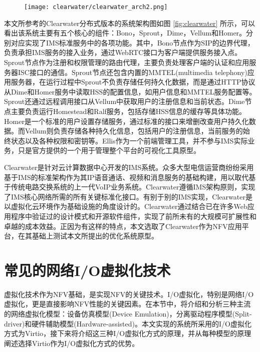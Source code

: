 \begin{figure}[!htp]
	\centering
	\texttt{[image: clearwater/clearwater\_arch2.png]}
\end{figure}
本文所参考的Clearwater分布式版本的系统架构图如图 \ref{fig:clearwater} 所示，可以看出该系统主要有五个核心的组件：Bono，Sprout，Dime，Vellum和Homer。分别对应实现了IMS标准服务中的各项功能。其中，Bono节点作为SIP的边界代理，负责承担IMS服务的接入业务，通过WebRTC接口为客户端提供服务接入点。Sprout节点作为注册和权限管理的路由代理，主要负责处理客户端的认证和应用服务器ISC接口的通信。Sprout节点还包含内置的MMTEL(multimedia telephony)应用服务器，在运行过程中Sprout不负责存储任何持久化数据，而是通过HTTP协议从Dime和Homer服务中读取HSS的配置信息，如用户信息和MMTEL服务配置等。Sprout还通过远程调用接口从Vellum中获取用户的注册信息和当前状态。Dime节点主要负责运行Homestead和Ralf服务，包括存储HSS信息的缓存等具体功能。Homer是一个标准的用户设置存储服务，通过标准的接口来增删改查用户持久化数据。而Vellum则负责存储各种持久化信息，包括用户的注册信息，当前服务的始终状态以及各种权限和密钥等。Ellis作为一个前端管理工具，并不参与IMS实际业务，只是官方提供的一个用于管理整个平台的可视化工具原型。

Clearwater是针对云计算数据中心开发的IMS系统。众多大型电信运营商纷纷采用基于IMS的标准架构作为其IP语音通话、视频和消息服务的基础构建，用以取代基于传统电路交换系统的上一代VoIP业务系统。Clearwater遵循IMS架构原则，实现了IMS核心网络所需的所有关键标准化接口。有别于别的IMS实现，Clearwater是以虚拟化云环境作为基础设施的角度设计的。Clearwater通过结合已在许多Web应用程序中验证过的设计模式和开源软件组件，实现了前所未有的大规模可扩展性和卓越的成本效益。正因为有这样的特点，本文选取了Clearwater作为NFV应用平台，在其基础上测试本文所提出的优化系统原型。

\section{常见的网络I/O虚拟化技术}
\label{intro:IO}
虚拟化技术作为NFV基础，是实现NFV的关键技术。I/O虚拟化，特别是网络I/O虚拟化，更是直接影响NFV性能的关键因素。在本节中，将介绍和分析三种主流的网络虚拟化模型：设备仿真模型(Device Emulation)，分离驱动程序模型(Split-driver)和硬件辅助模型(Hardware-assisted)。本文实现的系统所采用的I/O虚拟化方式为Virtio，接下来将介绍这三种I/O虚拟化方式的原理，并从每种模型的原理阐述选择Virtio作为I/O虚拟化方式的优势。

